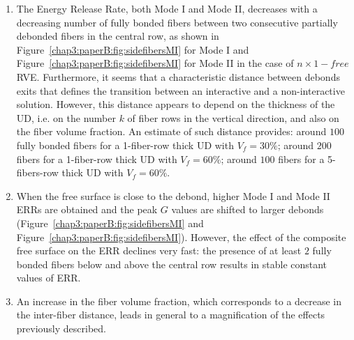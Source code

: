 \begin{enumerate}
\item The Energy Release Rate, both Mode I and Mode II, decreases with a decreasing number of fully bonded fibers between two consecutive partially debonded fibers in the central row, as shown in Figure~\ref{chap3:paperB:fig:sidefibersMI} for Mode I and Figure~\ref{chap3:paperB:fig:sidefibersMI} for Mode II in the case of $n\times1-free$ RVE. Furthermore, it seems that a characteristic distance between debonds exits that defines the transition between an interactive and a non-interactive solution. However, this distance appears to depend on the thickness of the UD, i.e. on the number $k$ of fiber rows in the vertical direction, and also on the fiber volume fraction. An estimate of such distance provides: around $100$ fully bonded fibers for a 1-fiber-row thick UD with $V_{f}=30\%$; around $200$ fibers for a 1-fiber-row thick UD with $V_{f}=60\%$; around $100$ fibers for a 5-fibers-row thick UD with $V_{f}=60\%$.
\item When the free surface is close to the debond, higher Mode I and Mode II ERRs are obtained and the peak $G$ values are shifted to larger debonds (Figure~\ref{chap3:paperB:fig:sidefibersMI} and Figure~\ref{chap3:paperB:fig:sidefibersMI}). However, the effect of the composite free surface on the ERR declines very fast: the presence of at least $2$ fully bonded fibers below and above the central row results in stable constant values of ERR.
\item An increase in the fiber volume fraction, which corresponds to a decrease in the inter-fiber distance, leads in general to a magnification of the effects previously described.
\end{enumerate}

